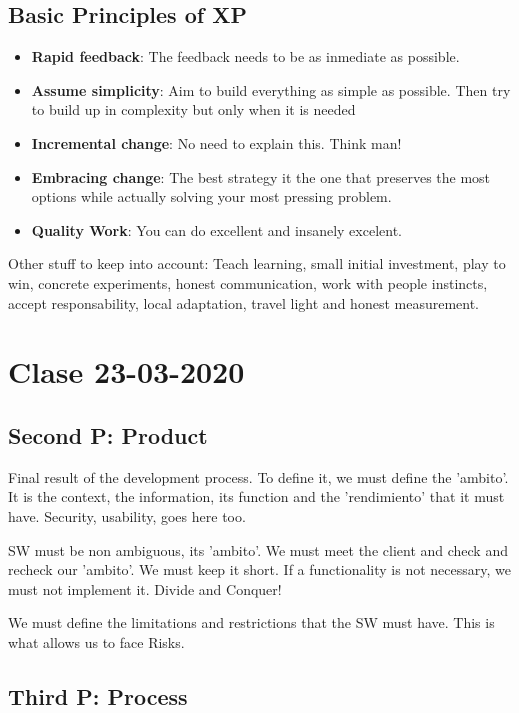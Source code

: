 \documentclass[a4paper,12pt]{article}
\begin{document}
\subsection{Basic Principles of XP}
\begin{itemize}
\item \textbf{Rapid feedback}: The feedback needs to be as inmediate as possible.
\item \textbf{Assume simplicity}: Aim to build everything as simple as possible. Then try to build up in complexity but only when it is needed

\item \textbf{Incremental change}: No need to explain this. Think man!
\item \textbf{Embracing change}: The best strategy it the one that preserves the most options while actually solving your most pressing problem.

\item \textbf{Quality Work}: You can do excellent and insanely excelent.
\end{itemize}
Other stuff to keep into account: Teach learning, small initial investment, play to win, concrete experiments, honest communication, work with people instincts, accept responsability, local adaptation, travel light and honest measurement.

\section{Clase 23-03-2020}

\subsection{Second P: Product}

Final result of the development process. To define it, we must define the 'ambito'. It is the context, the information, its function and the 'rendimiento' that it must have. Security, usability, goes here too.

SW must be non ambiguous, its 'ambito'. We must meet the client and check and recheck our 'ambito'. We must keep it short. If a functionality is not necessary, we must not implement it. Divide and Conquer!

We must define the limitations and restrictions that the SW must have. This is what allows us to face Risks.

\subsection{Third P: Process}
\end{document}
